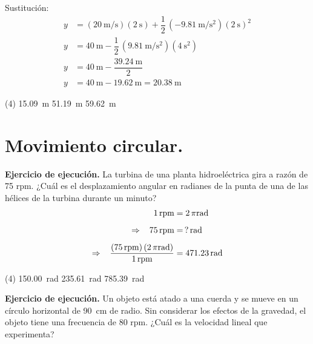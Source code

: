 \documentclass[12pt, letter]{exam}
\begin{document}
\begin{questions}
    Sustitución:
    \begin{align*}
    y &= \left( \displaystyle \SI[per-mode=fraction]{20}{\meter\per\second} \right) (\SI{2}{\second}) + \dfrac{1}{2} \, \left( \displaystyle -\SI[per-mode=fraction]{9.81}{\meter\per\square\second} \right) \left(\SI{2}{\second} \right)^{2} \\[0.5em]
    y &= \SI{40}{\meter} - \dfrac{1}{2} \, \left( \displaystyle \SI[per-mode=fraction]{9.81}{\meter\per\square\second} \right) \left(\SI{4}{\square\second} \right) \\[0.5em]
    y &= \SI{40}{\meter} - \dfrac{\SI{39.24}{\meter}}{2} \\[0.5em]
    y &= \SI{40}{\meter} - \SI{19.62}{\meter} = \SI{20.38}{\meter}
    \end{align*}
    \begin{tasks}(4)
        \task \SI{15.09}{\meter}
        \task {}
        \task \SI{51.19}{\meter}
        \task \SI{59.62}{\meter}
    \end{tasks}

    \section{Movimiento circular.}

    \setcounter{question}{14} \question \label{Ejercicio_07} \textbf{Ejercicio de ejecución. } La turbina de una planta hidroeléctrica gira a razón de 75 rpm. ¿Cuál es el desplazamiento angular en radianes de la punta de una de las hélices de la turbina durante un minuto?
    \begin{align*}
        1 \, \text{rpm} &= 2 \, \pi \unit{\radian} \\[0.5em]
        \Rightarrow \hspace{0.3cm} 75 \, \text{rpm} &= \, ? \, \unit{\radian} \\[0.5em]
        \Rightarrow \hspace{0.3cm} \dfrac{\left( 75 \, \text{rpm} \right) (2 \, \pi \unit{\radian})}{1 \, \text{rpm}} &= \SI{471.23}{\radian}
    \end{align*}
    \begin{tasks}(4)
        \task \SI{150.00}{\radian}
        \task \SI{235.61}{\radian}
        \task {}
        \task \SI{785.39}{\radian}
    \end{tasks}
    \setcounter{question}{15} \question \label{Ejercicio_08} \textbf{Ejercicio de ejecución. } Un objeto está atado a una cuerda y se mueve en un círculo horizontal de \SI{90}{\centi\meter} de radio. Sin considerar los efectos de la gravedad, el objeto tiene una frecuencia de \num{80} rpm. ¿Cuál es la velocidad lineal que experimenta?


\end{questions}
\end{document}
